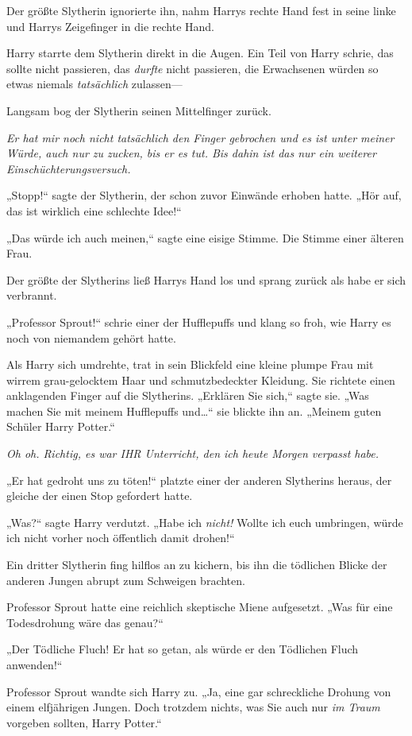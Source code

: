 {Der größte Slytherin ignorierte ihn, nahm Harrys rechte Hand fest in seine linke und Harrys Zeigefinger in die rechte Hand.

Harry starrte dem Slytherin direkt in die Augen. Ein Teil von Harry schrie, das sollte nicht passieren, das \emph{durfte} nicht passieren, die Erwachsenen würden so etwas niemals \emph{tatsächlich} zulassen—

Langsam bog der Slytherin seinen Mittelfinger zurück.

\emph{Er hat mir noch nicht tatsächlich den Finger gebrochen und es ist unter meiner Würde, auch nur zu zucken, bis er es tut. Bis dahin ist das nur ein weiterer Einschüchterungsversuch.}

„Stopp!“ sagte der Slytherin, der schon zuvor Einwände erhoben hatte. „Hör auf, das ist wirklich eine schlechte Idee!“

„Das würde ich auch meinen,“ sagte eine eisige Stimme. Die Stimme einer älteren Frau.

Der größte der Slytherins ließ Harrys Hand los und sprang zurück als habe er sich verbrannt.

„Professor Sprout!“ schrie einer der Hufflepuffs und klang so froh, wie Harry es noch von niemandem gehört hatte.

Als Harry sich umdrehte, trat in sein Blickfeld eine kleine plumpe Frau mit wirrem grau-gelocktem Haar und schmutzbedeckter Kleidung. Sie richtete einen anklagenden Finger auf die Slytherins. „Erklären Sie sich,“ sagte sie. „Was machen Sie mit meinem Hufflepuffs und…“ sie blickte ihn an. „Meinem guten Schüler Harry Potter.“

\emph{Oh oh. Richtig, es war IHR Unterricht, den ich heute Morgen verpasst habe.}

„Er hat gedroht uns zu töten!“ platzte einer der anderen Slytherins heraus, der gleiche der einen Stop gefordert hatte.

„Was?“ sagte Harry verdutzt. „Habe ich \emph{nicht!} Wollte ich euch umbringen, würde ich nicht vorher noch öffentlich damit drohen!“

Ein dritter Slytherin fing hilflos an zu kichern, bis ihn die tödlichen Blicke der anderen Jungen abrupt zum Schweigen brachten.

Professor Sprout hatte eine reichlich skeptische Miene aufgesetzt. „Was für eine Todesdrohung wäre das genau?“

„Der Tödliche Fluch! Er hat so getan, als würde er den Tödlichen Fluch anwenden!“

Professor Sprout wandte sich Harry zu. „Ja, eine gar schreckliche Drohung von einem elfjährigen Jungen. Doch trotzdem nichts, was Sie auch nur \emph{im Traum} vorgeben sollten, Harry Potter.“

}
